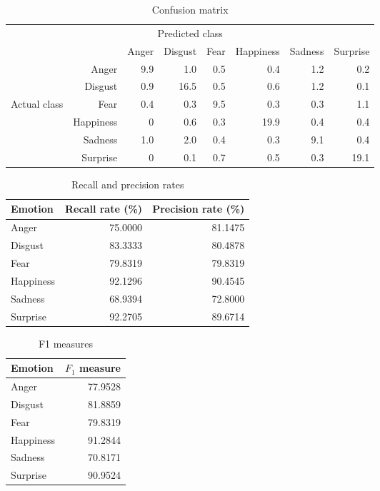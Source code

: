 \documentclass[12pt]{article}
\begin{document}
\begin{table}
\centering
\begin{tabular}{r r | r r r r r r}
\multicolumn{8}{c}{Predicted class} \\
&  & Anger & Disgust & Fear & Happiness & Sadness & Surprise \\
\hline
 & Anger            & 9.9 & 1.0  & 0.5 & 0.4  & 1.2 & 0.2  \\
 & Disgust          & 0.9 & 16.5 & 0.5 & 0.6  & 1.2 & 0.1  \\
Actual class & Fear & 0.4 & 0.3  & 9.5 & 0.3  & 0.3 & 1.1  \\
 & Happiness        & 0   & 0.6  & 0.3 & 19.9 & 0.4 & 0.4  \\
 & Sadness          & 1.0 & 2.0  & 0.4 & 0.3  & 9.1 & 0.4  \\
 & Surprise         & 0   & 0.1  & 0.7 & 0.5  & 0.3 & 19.1 \\
\end{tabular}
\caption{Confusion matrix}
\end{table}

\begin{table}
\centering
\begin{tabular}{l | r r}
Emotion & Recall rate (\%) & Precision rate (\%) \\
\hline
Anger     & 75.0000 & 81.1475 \\
Disgust   & 83.3333 & 80.4878 \\
Fear      & 79.8319 & 79.8319 \\
Happiness & 92.1296 & 90.4545 \\
Sadness   & 68.9394 & 72.8000 \\
Surprise  & 92.2705 & 89.6714 \\
\end{tabular}
\caption{Recall and precision rates}
\end{table}

\begin{table}
\centering
\begin{tabular}{l | r}
Emotion & \( F_1 \) measure \\
\hline
Anger     & 77.9528 \\
Disgust   & 81.8859 \\
Fear      & 79.8319 \\
Happiness & 91.2844 \\
Sadness   & 70.8171 \\
Surprise  & 90.9524 \\
\end{tabular}
\caption{F1 measures}
\end{table}
\end{document}
